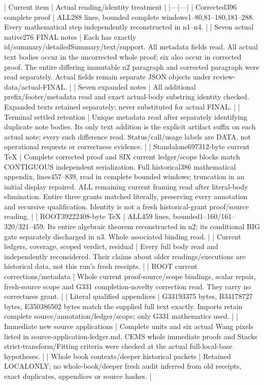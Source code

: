 \documentclass[11pt]{article}
\begin{document}
| Current item | Actual reading/identity treatment |
|---|---|
| Corrected396 complete proof | ALL288 lines, bounded complete windows1--80,81--180,181--288. Every mathematical step independently reconstructed in n1--n4. |
| Seven actual native276 FINAL notes | Each has exactly id/summary/detailedSummary/text/support. All metadata fields read. All actual text bodies occur in the uncorrected whole proof; six also occur in corrected proof. The entire differing immutable n2 paragraph and corrected paragraph were read separately. Actual fields remain separate JSON objects under review-data/actual-FINAL. |
| Seven expanded notes | All additional prefix/footer/metadata read and exact actual-body substring identity checked. Expanded texts retained separately; never substituted for actual FINAL. |
| Terminal settled retention | Unique metadata read after separately identifying duplicate note bodies. Its only text addition is the explicit artifact suffix on each actual note; every such difference read. Status/call/usage labels are DATA, not operational requests or correctness evidence. |
| Standalone697312-byte current TeX | Complete corrected proof and SIX current ledger/scope blocks match CONTIGUOUS independent serialization. Full historical386 mathematical appendix, lines457--839, read in complete bounded windows; truncation in an initial display repaired. ALL remaining current framing read after literal-body elimination. Entire three grants matched literally, preserving every annotation and recursive qualification. Identity is not a fresh historical-grant proof/source reading. |
| ROOT39222408-byte TeX | ALL459 lines, bounded1--160/161--320/321--459. Its entire algebraic theorem reconstructed in n2; its conditional BIG gate separately discharged in n3. Whole associated binding read. |
| Current ledgers, coverage, scoped verdict, residual | Every full body read and independently reconsidered. Their claims about older readings/executions are historical data, not this run's fresh receipts. |
| ROOT current corrections/metadata | Whole current proof-source/scope bindings, scalar repair, fresh-source scope and G331 completion-novelty correction read. They carry no correctness grant. |
| Literal qualified appendices | G33193375 bytes, B34178727 bytes, E350386502 bytes match the supplied full text exactly. Imports retain complete source/annotation/ledger/scope; only G331 mathematics used. |
| Immediate new source applications | Complete units and six actual Wang pixels listed in source-application-ledger.md. CEMS whole immediate proofs and Stacks strict-transform/Fitting criteria were checked at the actual full-local-base hypotheses. |
| Whole book contexts/deeper historical packets | Retained LOCALONLY; no whole-book/deeper fresh audit inferred from old receipts, exact duplicates, appendices or source hashes. |
\end{document}
